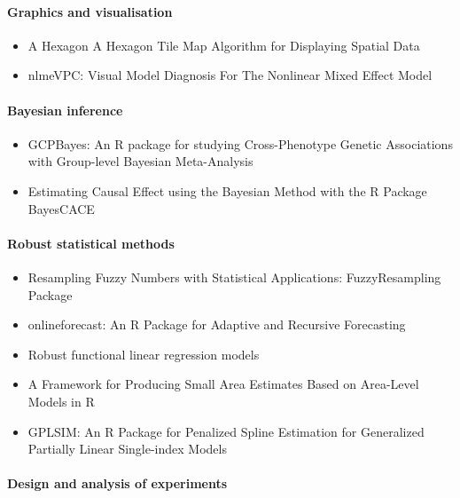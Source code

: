 \hypertarget{graphics-and-visualisation}{%
\paragraph{Graphics and visualisation}\label{graphics-and-visualisation}}

\begin{itemize}
\tightlist
\item
  A Hexagon A Hexagon Tile Map Algorithm for Displaying Spatial Data
\item
  nlmeVPC: Visual Model Diagnosis For The Nonlinear Mixed Effect Model
\end{itemize}

\hypertarget{bayesian-inference}{%
\paragraph{Bayesian inference}\label{bayesian-inference}}

\begin{itemize}
\tightlist
\item
  GCPBayes: An R package for studying Cross-Phenotype Genetic Associations with Group-level Bayesian Meta-Analysis
\item
  Estimating Causal Effect using the Bayesian Method with the R Package BayesCACE
\end{itemize}

\hypertarget{robust-statistical-methods}{%
\paragraph{Robust statistical methods}\label{robust-statistical-methods}}

\begin{itemize}
\tightlist
\item
  Resampling Fuzzy Numbers with Statistical Applications: FuzzyResampling Package
\item
  onlineforecast: An R Package for Adaptive and Recursive Forecasting
\item
  Robust functional linear regression models
\item
  A Framework for Producing Small Area Estimates Based on Area-Level Models in R
\item
  GPLSIM: An R Package for Penalized Spline Estimation for Generalized Partially Linear Single-index Models
\end{itemize}

\hypertarget{design-and-analysis-of-experiments}{%
\paragraph{Design and analysis of experiments}\label{design-and-analysis-of-experiments}}

